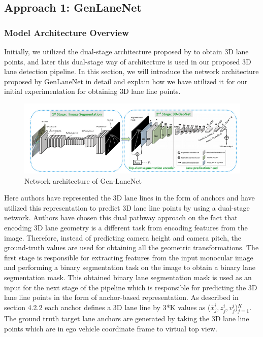         \subsection{Approach 1: GenLaneNet\cite{guo2020gen}}
        
        \subsubsection{Model Architecture Overview}
        Initially, we utilized the dual-stage architecture proposed by \cite{guo2020gen} to obtain 3D lane points, and later this dual-stage way of architecture is used in our proposed 3D lane detection pipeline. In this section, we will introduce the network architecture proposed by GenLaneNet\cite{guo2020gen} in detail and explain how we have utilized it for our initial experimentation for obtaining 3D lane line points.
        
         \begin{figure}[h]
    \centering
    \includegraphics[width=13cm]{images/GenLaneNET.png}
    \caption{Network architecture of Gen-LaneNet \cite{guo2020gen}}
    \end{figure}
         
         Here authors have represented the 3D lane lines in the form of anchors and have utilized this representation to predict 3D lane line points by using a dual-stage network. Authors have chosen this dual pathway approach on the fact that encoding 3D lane geometry is a different task from encoding features from the image. Therefore, instead of predicting camera height and camera pitch, the ground-truth values are used for obtaining all the geometric transformations. 
         The first stage is responsible for extracting features from the input monocular image and performing a binary segmentation task on the image to obtain a binary lane segmentation mask. This obtained binary lane segmentation mask is used as an input for the next stage of the pipeline which is responsible for predicting the 3D lane line points in the form of anchor-based representation. As described in section 4.2.2 each anchor defines a 3D lane line by 3*K values as ($\overline{x}^{i}_{j},z^{i}_{j},v^{i}_{j}$)$^{K}_{j=1}$. The ground truth target lane anchors are generated by taking the 3D lane line points which are in ego vehicle coordinate frame to virtual top view.
         
